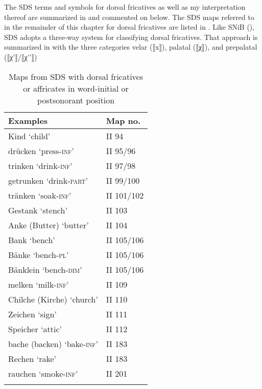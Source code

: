 {The SDS terms and symbols for dorsal fricatives as well as my interpretation thereof are summarized in  and commented on below. The SDS maps referred to in the remainder of this chapter for dorsal fricatives are listed in . Like SNiB (), SDS adopts a three-way system for classifying dorsal fricatives. That approach is summarized in  with the three categories velar (⟦x⟧), palatal (⟦χ⟧), and prepalatal (⟦χ'⟧/⟦χ'{}'⟧)


\begin{table}
\caption{SDS symbols for dorsal fricatives}
\label{tab:15.1}
\end{table}

\begin{table}
\caption{Maps from SDS with dorsal fricatives or affricates in word-initial or postsonorant position\label{tab:15.2}}
\begin{tabular}{ll}
\lsptoprule
Examples & Map no.\\\midrule
Kind ‘child’ & II 94\\
drücken ‘press-\textsc{inf}’ & II 95/96\\
trinken ‘drink-\textsc{inf}’ & II 97/98\\
getrunken ‘drink-\textsc{part}’ & II 99/100\\
tränken ‘soak-\textsc{inf}’ & II 101/102\\
Gestank ‘stench’ & II 103\\
Anke (Butter) ‘butter’ & II 104\\
Bank ‘bench’& II 105/106\\
Bänke ‘bench-\textsc{pl}’& II 105/106\\
Bänklein ‘bench-\textsc{dim}’ & II 105/106\\
melken ‘milk-\textsc{inf}’ & II 109\\
Chilche (Kirche) ‘church’ & II 110\\
Zeichen ‘sign’ & II 111\\
Speicher ‘attic’ & II 112\\
bache (backen) ‘bake-\textsc{inf}’ & II 183 \\
Rechen ‘rake’ & II 183\\
rauchen ‘smoke-\textsc{inf}’ & II 201\\
\lspbottomrule
\end{tabular}
\end{table}

}
